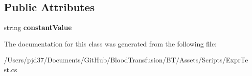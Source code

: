 \subsection*{Public Attributes}
\begin{DoxyCompactItemize}
\item 
string {\bfseries constant\+Value}\hypertarget{class_b83_1_1_logic_expression_parser_1_1_constant_string_a1ff502a70aa863e44844627300a81b54}{}\label{class_b83_1_1_logic_expression_parser_1_1_constant_string_a1ff502a70aa863e44844627300a81b54}

\end{DoxyCompactItemize}


The documentation for this class was generated from the following file\+:\begin{DoxyCompactItemize}
\item 
/\+Users/pjd37/\+Documents/\+Git\+Hub/\+Blood\+Transfusion/\+B\+T/\+Assets/\+Scripts/Expr\+Test.\+cs\end{DoxyCompactItemize}

